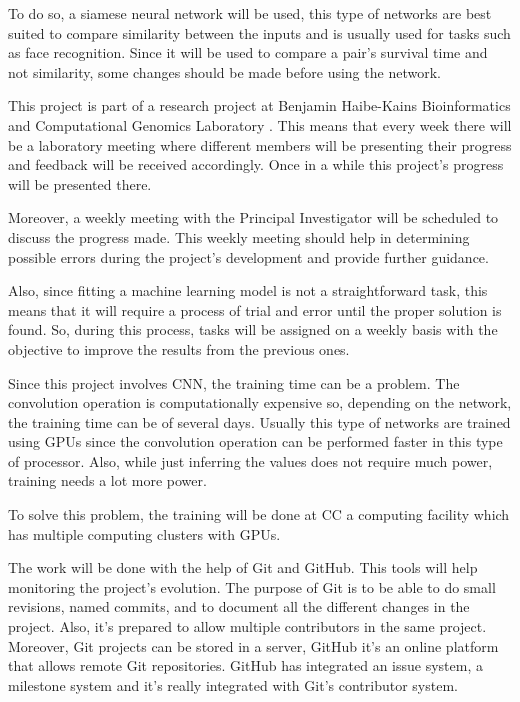To do so, a siamese neural network will be used,
this type of networks are best suited to compare similarity between the inputs and is usually
used for tasks such as face recognition. Since it will be used to compare a pair's survival
time and not similarity, some changes should be made before using the network.


This project is part of a research project at Benjamin Haibe-Kains Bioinformatics and 
Computational Genomics Laboratory \cite{bhklab}. This means that every week there will be a 
laboratory meeting where different members will be presenting their progress and feedback will
be received accordingly. Once in a while this project's progress will be presented there.

Moreover, a weekly meeting with the Principal Investigator will be scheduled to discuss
the progress made. This weekly meeting should help in determining possible errors during the 
project's development and provide further guidance.

Also, since fitting a machine learning model is not a straightforward task, this means that 
it will require a process of trial and error until the proper solution is found. 
So, during this process, tasks will be assigned on a weekly basis with the objective to
improve the results from the previous ones.



Since this project involves \gls{CNN}, the training time can be a problem. 
The convolution operation is computationally expensive so, depending on the network, the 
training time can be of several days. Usually this type of networks are trained using 
GPUs since the convolution operation can be performed faster in this type of processor. 
Also, while just inferring the values does not require
much power, training needs a lot more power. 

To solve this problem, the training will be done at \gls{CC} a computing facility which 
has multiple computing clusters with GPUs.


The work will be done with the help of Git and GitHub. This tools will help monitoring
the project's evolution. The purpose of Git is to be able to do small revisions,
named commits, and to document all the different changes in the project. Also, it's 
prepared to allow multiple contributors in the same project. Moreover,
Git projects can be stored in a server, GitHub it's an online platform that allows
remote Git repositories. GitHub has integrated an issue system, a milestone system
and it's really integrated with Git's contributor system.
~\cites{tool:git}{tool:github}

